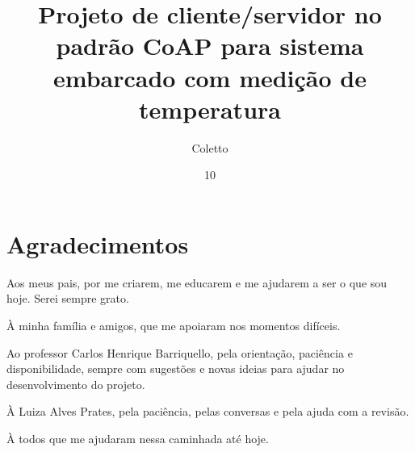 \documentclass[tg]{mdtufsm}
\title{Projeto de cliente/servidor no padrão CoAP para sistema embarcado com medição de temperatura}
\author{Coletto}{Mikael Marin}
\institute{Centro de Tecnologia}
\date{10}{Dezembro}{2015}
\begin{document}
\maketitle

\restoregeometry


\makeapprove


\chapter*{Agradecimentos}
Aos meus pais, por me criarem, me educarem e me ajudarem a ser o que sou hoje. Serei sempre grato.

\`A minha família e amigos, que me apoiaram nos momentos difíceis.

Ao professor Carlos Henrique Barriquello, pela orientação, paciência e disponibilidade, sempre com sugestões e novas ideias para ajudar no desenvolvimento do projeto.

\`A Luiza Alves Prates, pela paciência, pelas conversas e pela ajuda com a revisão.

\`A todos que me ajudaram nessa caminhada até hoje.
\end{document}
